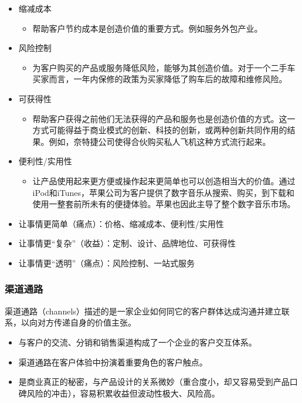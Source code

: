 \begin{itemize}
\begin{itemize}
		\end{itemize}
		\item 缩减成本
		\begin{itemize}
			\item 帮助客户节约成本是创造价值的重要方式。例如服务外包产业。
		\end{itemize}
		\item 风险控制
		\begin{itemize}
			\item 为客户购买的产品或服务降低风险，能够为其创造价值。对于一个二手车买家而言，一年内保修的政策为买家降低了购车后的故障和维修风险。
		\end{itemize}
		\item 可获得性
		\begin{itemize}
			\item 帮助客户获得之前他们无法获得的产品和服务也是创造价值的方式。这一方式可能得益于商业模式的创新、科技的创新，或两种创新共同作用的结果。例如，奈特捷公司使得合伙购买私人飞机这种方式流行起来。
		\end{itemize}
		\item 便利性/实用性
		\begin{itemize}
			\item 让产品使用起来更方便或操作起来更简单也可以创造相当大的价值。通过iPod和iTunes，苹果公司为客户提供了数字音乐从搜索、购买，到下载和使用一整套前所未有的便捷体验。苹果也因此主导了整个数字音乐市场。
		\end{itemize}
	\end{itemize}
		
		
	\begin{itemize}
		\item 让事情更简单（痛点）：价格、缩减成本、便利性/实用性
		\item 让事情更“复杂”（收益）：定制、设计、品牌地位、可获得性
		\item 让事情更“透明”（痛点）：风险控制、一站式服务
	\end{itemize}

	\subsubsection{渠道通路}
	渠道通路（channels）描述的是一家企业如何同它的客户群体达成沟通并建立联系，以向对方传递自身的价值主张。
	\begin{itemize}
		\item 与客户的交流、分销和销售渠道构成了一个企业的客户交互体系。
		\item 渠道通路在客户体验中扮演着重要角色的客户触点。
		\item 是商业真正的秘密，与产品设计的关系微妙（重合度小，却又容易受到产品口碑风险的冲击），容易积累收益但波动性极大、风险高。
	\end{itemize}

